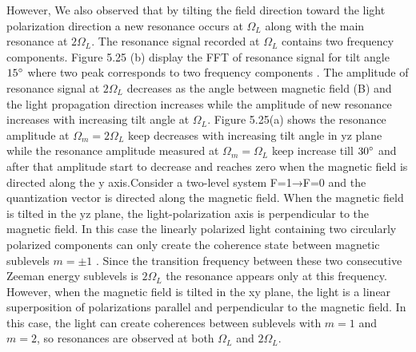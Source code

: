 However, We also observed that by tilting the field direction toward the light polarization direction a new resonance occurs at $\Omega_L$ along with the main resonance at $2\Omega_L$. The resonance signal recorded at $\Omega_L$ contains two frequency components. Figure 5.25 (b) display the FFT of resonance signal for tilt angle $15\degree$ where two peak corresponds to two frequency components . The amplitude of  resonance signal at $2\Omega_L$  decreases as the angle between magnetic field (B) and the light propagation direction increases while the amplitude of new resonance  increases with increasing tilt angle at $\Omega_L$. Figure 5.25(a) shows the resonance amplitude at $\Omega_m=2\Omega_L$ keep decreases with increasing tilt angle in yz plane while  the resonance amplitude measured at $\Omega_m=\Omega_L$ keep increase till $30\degree$ and after that amplitude start to decrease and reaches zero when the magnetic field is directed along the y axis.Consider a two-level system F=1→F=0 and the quantization vector is directed along the magnetic field. When the magnetic field is tilted in the yz plane, the light-polarization axis is perpendicular to the magnetic field. In this case the linearly polarized light containing two circularly polarized components can only create the coherence state between magnetic sublevels $m = ±1$ . Since the transition frequency between these two consecutive Zeeman energy sublevels is $2\Omega_L$  the resonance appears only at this frequency. However, when the magnetic field is tilted  in the xy plane, the light is a linear superposition of polarizations parallel and perpendicular to the magnetic field. In this case, the light can create coherences between sublevels with $m=1$ and $m=2$, so resonances are observed at both $\Omega_L $ and $2\Omega_L$.

